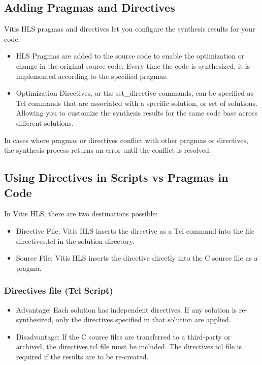 \subsection{Adding Pragmas and Directives}
Vitis HLS pragmas and directives let you configure the synthesis results for your code.
\begin{itemize}
  \item HLS Pragmas are added to the source code to enable the optimization or change in the original source code. Every time the code is synthesized, it is implemented according to the specified pragmas.
  \item Optimization Directives, or the set\_directive commands, can be specified as Tcl commands that are associated with a specific solution, or set of solutions. Allowing you to customize the synthesis results for the same code base across different solutions.
\end{itemize}

\begin{highlight}
  In cases where pragmas or directives conflict with other pragmas or directives, the synthesis process returns an error until the conflict is resolved. 
\end{highlight}

\subsection{Using Directives in Scripts vs Pragmas in Code}
In Vitis HLS, there are two destinations possible:
\begin{itemize}
  \item Directive File: Vitis HLS inserts the directive as a Tcl command into the file directives.tcl in the solution directory.
  \item Source File: Vitis HLS inserts the directive directly into the C source file as a pragma.  
\end{itemize}

\subsubsection{Directives file (Tcl Script)}
\begin{itemize}
  \item Advantage: Each solution has independent directives. If any solution is re-synthesized, only the directives specified in that solution are applied.
  \item Disadvantage: If the C source files are transferred to a third-party or archived, the directives.tcl file must be included. The directives.tcl file is required if the results are to be re-created.
\end{itemize}

